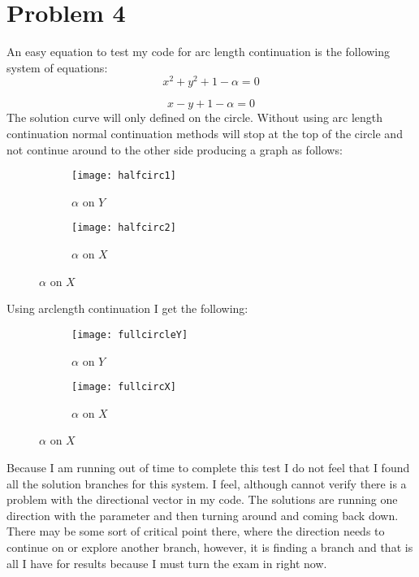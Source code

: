 \documentclass[]{article}
\begin{document}
\section*{Problem 4}

An easy equation to test my code for arc length continuation is the following system of equations:
\begin{equation}
x^2 + y^2  + 1-\alpha = 0
\end{equation}

\begin{equation}
x - y + 1 - \alpha = 0 
\end{equation}
The solution curve will only defined on the circle. Without using arc length continuation normal continuation methods will stop at the top of the circle and not continue around to the other side producing a graph as follows: 

\begin{figure}[H]
	\centering
	\begin{subfigure}{.4\textwidth}
	\texttt{[image: halfcirc1]}
	\caption{$ \alpha $  on $ Y  $ }
	\end{subfigure}
	\begin{subfigure}{.5\textwidth}
		\texttt{[image: halfcirc2]}
			\caption{$ \alpha $  on $ X  $ }
	\end{subfigure}
\end{figure}


Using arclength continuation I get the following:

\begin{figure}[H]
	\centering
	\begin{subfigure}{.4\textwidth}
		\texttt{[image: fullcircleY]}
		\caption{$ \alpha $  on $ Y  $ }
	\end{subfigure}
	\begin{subfigure}{.5\textwidth}
		\texttt{[image: fullcircX]}
		\caption{$ \alpha $  on $  X $ }
	\end{subfigure}
\end{figure}
Because I am running out of time to complete this test I do not feel that I found all the solution branches for this system. I feel, although cannot verify there is a problem with the directional vector in my code. The solutions are running one direction with the parameter and then turning around and coming back down. There may be some sort of critical point there, where the direction needs to continue on or explore another branch, however, it is finding a branch and that is all I have for results because I must turn the exam in right now. 
\end{document}
